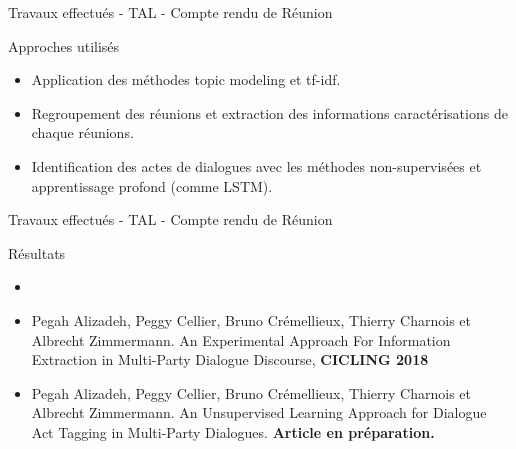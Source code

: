 \documentclass{beamer}
\begin{document}
{{\begin{frame}{Travaux effectués - TAL - Compte rendu de Réunion }
\begin{block}{Approches utilisés}
\begin{itemize}
	\item Application des méthodes topic modeling et tf-idf.
	\item Regroupement des réunions et extraction des informations caractérisations de chaque réunions. 
	\item Identification des actes de dialogues avec les méthodes non-supervisées et apprentissage profond (comme LSTM).
\end{itemize}
\end{block}
\end{frame}


\begin{frame}{Travaux effectués - TAL - Compte rendu de Réunion }

\begin{block}{Résultats}
\begin{itemize}
\item
\end{itemize}
\end{block}

\begin{itemize}
\small
\item Pegah Alizadeh, Peggy Cellier, Bruno Crémellieux, Thierry Charnois et Albrecht Zimmermann. An Experimental Approach For Information Extraction in Multi-Party Dialogue Discourse, \textbf{CICLING 2018}
\item Pegah Alizadeh, Peggy Cellier, Bruno Crémellieux, Thierry Charnois et Albrecht Zimmermann. An Unsupervised Learning Approach for Dialogue Act Tagging in Multi-Party Dialogues. \textbf{Article en préparation.}
\end{itemize}

\end{frame}

}}
\end{document}
